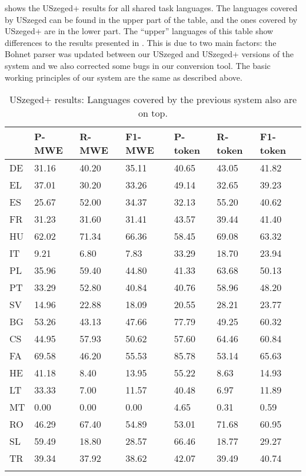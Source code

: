 \documentclass[output=paper,modfonts]{langscibook}
\begin{document}
 shows the USzeged+ results for all shared task languages. The languages covered by USzeged can be found in the upper part of the table, and the ones covered by USzeged+ are in the lower part. The ``upper'' languages of this table show differences to the results presented in \citep{Simko2017}. This is due to two main factors: the Bohnet parser was updated between our USzeged and USzeged+ versions of the system and we also corrected some bugs in our conversion tool. The basic working principles of our system are the same as described above.

\begin{table}
\centering
\caption{USzeged+ results: Languages covered by the previous system also are on top.}
\label{resultstable2}
\begin{tabular}{lllllll}
  \lsptoprule
& P-MWE & R-MWE  & F1-MWE  & P-token & R-token & F1-token \\
 \midrule
DE     & 31.16 & 40.20 & 35.11 & 40.65 & 43.05 & 41.82   \\
EL     & 37.01 & 30.20 & 33.26 & 49.14 & 32.65 & 39.23   \\
ES     & 25.67 & 52.00 & 34.37 & 32.13 & 55.20 & 40.62   \\
FR     & 31.23 & 31.60 & 31.41 & 43.57 & 39.44 & 41.40   \\
HU     & 62.02 & 71.34 & 66.36 & 58.45 & 69.08 & 63.32   \\
IT     & 9.21 & 6.80 & 7.83 & 33.29 & 18.70 & 23.94   \\
PL     & 35.96 & 59.40 & 44.80 & 41.33 & 63.68 & 50.13   \\
PT     & 33.29 & 52.80 & 40.84 & 40.76 & 58.96 & 48.20   \\
SV     & 14.96 & 22.88 & 18.09 & 20.55 & 28.21 & 23.77   \\
   \midrule 
BG     & 53.26 & 43.13 & 47.66 & 77.79 & 49.25 & 60.32   \\
CS     & 44.95 & 57.93 & 50.62 & 57.60 & 64.46 & 60.84   \\
FA     & 69.58 & 46.20 & 55.53 & 85.78 & 53.14 & 65.63   \\
HE     & 41.18 & 8.40 & 13.95 & 55.22 & 8.63 & 14.93  \\
LT     & 33.33 & 7.00 & 11.57 & 40.48 & 6.97 & 11.89  \\
MT     & 0.00 & 0.00 & 0.00 & 4.65 & 0.31 & 0.59  \\
RO     & 46.29 & 67.40 & 54.89 & 53.01 & 71.68 & 60.95  \\
SL     & 59.49 & 18.80 & 28.57 & 66.46 & 18.77 & 29.27  \\
TR     & 39.34 & 37.92 & 38.62 & 42.07 & 39.49 & 40.74  \\

  \lspbottomrule
\end{tabular}
\end{table}
\end{document}
